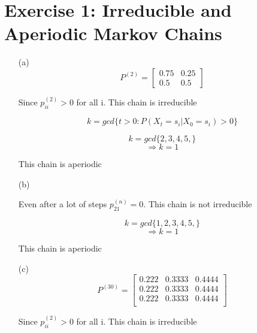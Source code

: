 \documentclass[unicode,11pt,a4paper,oneside,numbers=endperiod,openany]{scrartcl}
\begin{document}
\setassignment
{}


\section*{Exercise 1: Irreducible and Aperiodic Markov Chains}

\begin{itemize}
	\item [(a)]
	\[
	P^{(2)} = \begin{bmatrix}
                0.75 & 0.25\\
                0.5 & 0.5
              \end{bmatrix}
    \]
              
    {Since ${p^{(2)}_{ii} > 0}$ for all i. This chain is irreducible}
    
    \begin{equation}
    {k = gcd\{t > 0: P(X_t = s_i|X_0 = s_i) > 0\}}
    \end{equation}
    
    \[
    {k = gcd\{2, 3, 4, 5,\}}
    \]
    \[
    \Rightarrow { k = 1}
    \]    
    
    {This chain is aperiodic}
    
    
    
	\item [(b)]
              
    {Even after a lot of steps  ${p^{(n)}_{21} = 0}$. This chain is not irreducible}
    
    
    \[
    {k = gcd\{1, 2, 3, 4, 5,\}}
    \]
    \[
    \Rightarrow { k = 1}
    \]    
    
    {This chain is aperiodic}
    
	
	\item [(c)]
	\[
		P^{(30)} = \begin{bmatrix}
                0.222 & 0.3333 & 0.4444\\
                0.222 & 0.3333 & 0.4444\\
                0.222 & 0.3333 & 0.4444\\
              \end{bmatrix}
    \]
              
    {Since ${p^{(2)}_{ii} > 0}$ for all i. This chain is irreducible}
\end{itemize}
\end{document}
